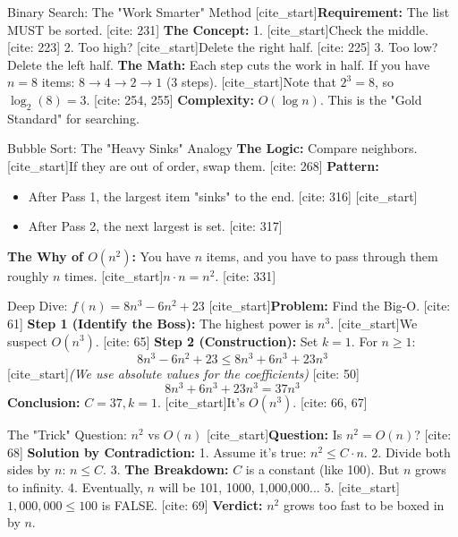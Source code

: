 \documentclass[landscape]{beamer}
\begin{document}
\begin{frame}{Binary Search: The "Work Smarter" Method}
    [cite_start]\textbf{Requirement:} The list MUST be sorted. [cite: 231]
    \textbf{The Concept:}
    1. [cite_start]Check the middle. [cite: 223]
    2. Too high? [cite_start]Delete the right half. [cite: 225]
    3. Too low? Delete the left half.
    \textbf{The Math:}
    Each step cuts the work in half. If you have $n=8$ items:
    $8 \to 4 \to 2 \to 1$ (3 steps).
    [cite_start]Note that $2^3 = 8$, so $\log_2(8) = 3$. [cite: 254, 255]
    \textbf{Complexity:} $O(\log n)$. This is the "Gold Standard" for searching.
\end{frame}

\begin{frame}{Bubble Sort: The "Heavy Sinks" Analogy}
    \textbf{The Logic:} Compare neighbors. [cite_start]If they are out of order, swap them. [cite: 268]
    \textbf{Pattern:}
    \begin{itemize}
        [cite_start]\item After Pass 1, the largest item "sinks" to the end. [cite: 316]
        [cite_start]\item After Pass 2, the next largest is set. [cite: 317]
    \end{itemize}
    \textbf{The Why of $O(n^2)$:}
    You have $n$ items, and you have to pass through them roughly $n$ times.
    [cite_start]$n \cdot n = n^2$. [cite: 331]
\end{frame}

\begin{frame}{Deep Dive: $f(n) = 8n^3 - 6n^2 + 23$}
    [cite_start]\textbf{Problem:} Find the Big-O. [cite: 61]
    \textbf{Step 1 (Identify the Boss):} The highest power is $n^3$. [cite_start]We suspect $O(n^3)$. [cite: 65]
    \textbf{Step 2 (Construction):}
    Set $k=1$. For $n \ge 1$:
    \[ 8n^3 - 6n^2 + 23 \le 8n^3 + 6n^3 + 23n^3 \]
    [cite_start]\textit{(We use absolute values for the coefficients)} [cite: 50]
    \[ 8n^3 + 6n^3 + 23n^3 = 37n^3 \]
    \textbf{Conclusion:} $C=37, k=1$. [cite_start]It's $O(n^3)$. [cite: 66, 67]
\end{frame}

\begin{frame}{The "Trick" Question: $n^2$ vs $O(n)$}
    [cite_start]\textbf{Question:} Is $n^2 = O(n)$? [cite: 68]
    \textbf{Solution by Contradiction:}
    1. Assume it's true: $n^2 \le C \cdot n$.
    2. Divide both sides by $n$: $n \le C$.
    3. \textbf{The Breakdown:} $C$ is a constant (like 100). But $n$ grows to infinity.
    4. Eventually, $n$ will be 101, 1000, 1,000,000...
    5. [cite_start]$1,000,000 \le 100$ is FALSE. [cite: 69]
    \textbf{Verdict:} $n^2$ grows too fast to be boxed in by $n$.
\end{frame}
\end{document}
